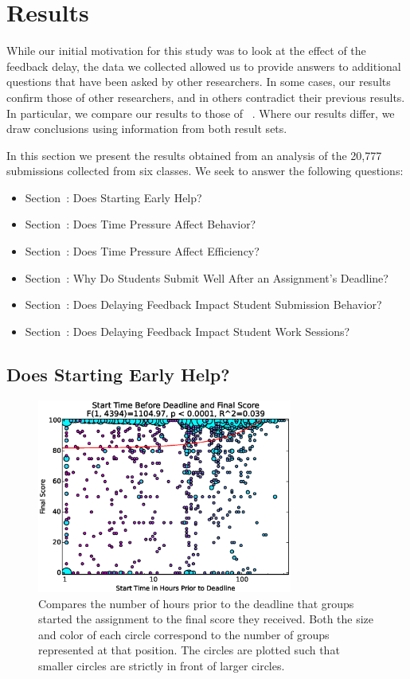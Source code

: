 \section{Results}
While our initial motivation for this study was to look at the effect of the
feedback delay, the data we collected allowed us to provide answers to
additional questions that have been asked by other researchers. In some cases,
our results confirm those of other researchers, and in others contradict their
previous results. In particular, we compare our results to those of
\spacco{}~\cite{Spacco:2013:TIP:2462476.2465594}. Where our results differ, we
draw conclusions using information from both result sets.

In this section we present the results obtained from an analysis of the 20,777
submissions collected from six classes. We seek to answer the following
questions:

\begin{itemize}
\item Section~: Does Starting Early Help?
\item Section~: Does Time Pressure Affect Behavior?
\item Section~: Does Time Pressure Affect Efficiency?
\item Section~: Why Do Students Submit Well After an
  Assignment's Deadline?
\item Section~: Does Delaying Feedback Impact Student
  Submission Behavior?
\item Section~: Does Delaying Feedback Impact Student
  Work Sessions?
\end{itemize}

\subsection{Does Starting Early Help?}

\begin{figure}[!t]
\centering
\includegraphics[width=3.3in]{graphs/Start_Time_Before_Deadline_and_Final_Score.eps}
\caption{Compares the number of hours prior to the deadline that groups started
  the assignment to the final score they received. Both the size and color of
  each circle correspond to the number of groups represented at that
  position. The circles are plotted such that smaller circles are strictly in
  front of larger circles.}
\end{figure}

